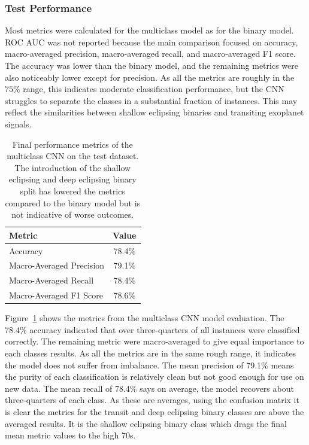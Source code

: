 \subsubsection{Test Performance}

Most metrics were calculated for the multiclass model as for the binary model. ROC AUC was not reported because the main comparison focused on accuracy, macro-averaged precision, macro-averaged recall, and macro-averaged F1 score. The accuracy was lower than the binary model, and the remaining metrics were also noticeably lower except for precision. As all the metrics are roughly in the $75\%$ range, this indicates moderate classification performance, but the CNN struggles to separate the classes in a substantial fraction of instances. This may reflect the similarities between shallow eclipsing binaries and transiting exoplanet signals.

\begin{table}[H]
    \centering
    \begin{tabular}{lc}
        \hline
        \textbf{Metric} & \textbf{Value} \\
        \hline
        Accuracy                 & 78.4\% \\
        Macro-Averaged Precision & 79.1\% \\
        Macro-Averaged Recall    & 78.4\% \\
        Macro-Averaged F1 Score  & 78.6\% \\
        \hline
    \end{tabular}
    \caption{Final performance metrics of the multiclass CNN on the test dataset. The introduction of the shallow eclipsing and deep eclipsing binary split has lowered the metrics compared to the binary model but is not indicative of worse outcomes. \label{tab:mc_metrics_table}}
\end{table}

Figure~\ref{tab:mc_metrics_table} shows the metrics from the multiclass CNN model evaluation. The 78.4\% accuracy indicated that over three-quarters of all instances were classified correctly. The remaining metric were macro-averaged to give equal importance to each classes results. As all the metrics are in the same rough range, it indicates the model does not suffer from imbalance. The mean precision of 79.1\% means the purity of each classification is relatively clean but not good enough for use on new data. The mean recall of 78.4\% says on average, the model recovers about three-quarters of each class. As these are averages, using the confusion matrix it is clear the metrics for the transit and deep eclipsing binary classes are above the averaged results. It is the shallow eclipsing binary class which drags the final mean metric values to the high 70s.


